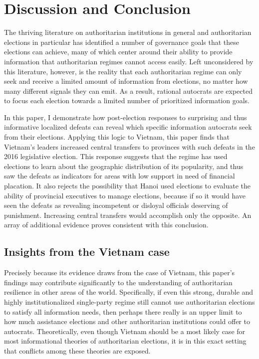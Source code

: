 \documentclass[12pt]{article}
\newcommand{\1}{\mathbbm{1}}
\begin{document}
\section*{Discussion and Conclusion}

The thriving literature on authoritarian institutions in general and authoritarian elections in particular has identified a number of governance goals that these elections can achieve, many of which center around their ability to provide information that authoritarian regimes cannot access easily. Left unconsidered by this literature, however, is the reality that each authoritarian regime can only seek and receive a limited amount of information from elections, no matter how many different signals they can emit. As a result, rational autocrats are expected to focus each election towards a limited number of prioritized information goals.

In this paper, I demonstrate how post-election responses to surprising and thus informative localized defeats can reveal which specific information autocrats seek from their elections. Applying this logic to Vietnam, this paper finds that Vietnam's leaders increased central transfers to provinces with such defeats in the 2016 legislative election. This response suggests that the regime has used elections to learn about the geographic distribution of its popularity, and thus saw the defeats as indicators for areas with low support in need of financial placation. It also rejects the possibility that Hanoi used elections to evaluate the ability of provincial executives to manage elections, because if so it would have seen the defeats as revealing incompetent or disloyal officials deserving of punishment. Increasing central transfers would accomplish only the opposite. An array of additional evidence proves consistent with this conclusion.

\subsection*{Insights from the Vietnam case}

Precisely because its evidence draws from the case of Vietnam, this paper's findings may contribute significantly to the understanding of authoritarian resilience in other areas of the world. Specifically, if even this strong, durable and highly institutionalized single-party regime still cannot use authoritarian elections to satisfy all information needs, then perhaps there really is an upper limit to how much assistance elections and other authoritarian institutions could offer to autocrats. Theoretically, even though Vietnam should be a most likely case for most informational theories of authoritarian elections, it is in this exact setting that conflicts among these theories are exposed.
\end{document}
